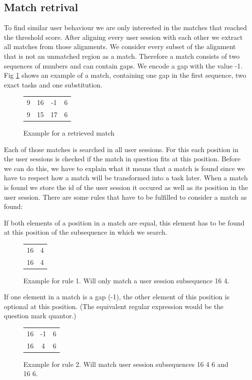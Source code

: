 \subsection{Match retrival}
To find similar user behaviour we are only interested in the matches that reached the threshold score. After aligning every user session with each other we extract all matches from those alignments.
We consider every subset of the alignment that is not an unmatched region as a match.
Therefore a match consists of two sequences of numbers and can contain gaps. We encode a gap with the value -1. 
Fig \ref{fig:matchexample} shows an example of a match, containing one gap in the first sequence, two exact tasks and one substitution.

\begin{figure}[h]
	\centering
	\begin{tabular}{cccc}
		9 & 16 & -1 & 6 \\
		9 & 15 & 17 & 6  
	\end{tabular}
	\caption{Example for a retrieved match}
	\label{fig:matchexample}
\end{figure}

Each of those matches is searched in all user sessions. For this each position in the user sessions is checked if the match in question fits at this position.
Before we can do this, we have to explain what it means that a match is found since we have to respect how a match will be transformed into a task later.
When a match is found we store the id of the user session it occured as well as its position in the user session.
There are some rules that have to be fulfilled to consider a match as found:

	\begin{rules}
		\item If both elements of a position in a match are equal, this element has to be found at this position of the subsequence in which we search.
	\end{rules}
	\begin{figure}[h]
		\centering
			\begin{tabular}{cc}
				 16 & 4\\
				 16 & 4\\  
			\end{tabular}
		\caption{Example for rule 1. Will only match a user session subsequence 16 4.}
		\label{fig:rule1}
	\end{figure}
	

	\begin{rules}
		\item If one element in a match is a gap (-1), the other element of this position is optional at this position. (The equivalent regular expression would be the question mark quantor.)
	\end{rules}
	\begin{figure}[h]
		\centering
			\begin{tabular}{ccc}
				16 & -1 &6\\
				16 &  4 & 6\\  
			\end{tabular}
			\caption{Example for rule 2. Will match user session subsequences 16 4 6 and 16 6.}
		\label{fig:rule2}
	\end{figure}
	
